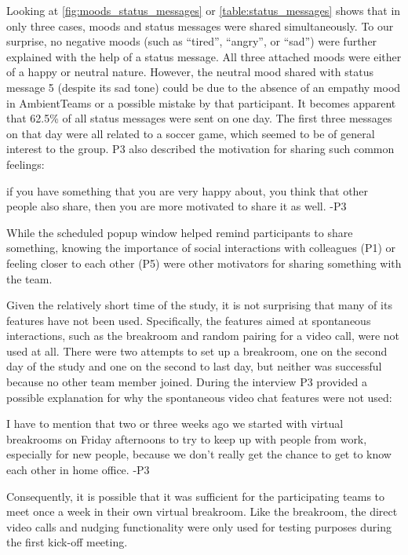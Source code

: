 Looking at \autoref{fig:moods_status_messages} or \autoref{table:status_messages} shows that in only three cases, moods and status messages were shared simultaneously. To our surprise, no negative moods (such as \enquote{tired}, \enquote{angry}, or \enquote{sad}) were further explained with the help of a status message. All three attached moods were either of a happy or neutral nature. However, the neutral mood shared with status message 5 (despite its sad tone) could be due to the absence of an empathy mood in AmbientTeams or a possible mistake by that participant. It becomes apparent that 62.5\% of all status messages were sent on one day. The first three messages on that day were all related to a soccer game, which seemed to be of general interest to the group. P3 also described the motivation for sharing such common feelings:

\begin{displayquote}[][]
    [...] if you have something that you are very happy about, you think that other people also share, then you are more motivated to share it as well. -P3
\end{displayquote}

While the scheduled popup window helped remind participants to share something, knowing the importance of social interactions with colleagues (P1) or feeling closer to each other (P5) were other motivators for sharing something with the team.

Given the relatively short time of the study, it is not surprising that many of its features have not been used. Specifically, the features aimed at spontaneous interactions, such as the breakroom and random pairing for a video call, were not used at all. There were two attempts to set up a breakroom, one on the second day of the study and one on the second to last day, but neither was successful because no other team member joined. During the interview P3 provided a possible explanation for why the spontaneous video chat features were not used:

\begin{displayquote}[][]
    [...] I have to mention that two or three weeks ago we started with virtual breakrooms on Friday afternoons to try to keep up with people from work, especially for new people, because we don't really get the chance to get to know each other in home office. -P3
\end{displayquote}

Consequently, it is possible that it was sufficient for the participating teams to meet once a week in their own virtual breakroom. Like the breakroom, the direct video calls and nudging functionality were only used for testing purposes during the first kick-off meeting. %

